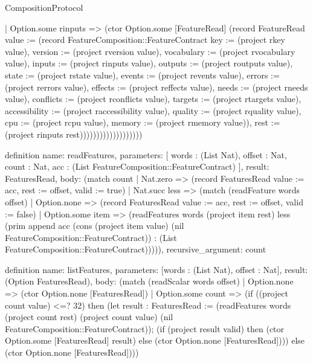 \begin{lexlean}{CompositionProtocol}
\begin{semanticmodule}
{                                  | Option.some rinputs => (ctor Option.some [FeatureRead] (record FeatureRead {value := (record FeatureComposition::FeatureContract {key := (project rkey value), version := (project rversion value), vocabulary := (project rvocabulary value), inputs := (project rinputs value), outputs := (project routputs value), state := (project rstate value), events := (project revents value), errors := (project rerrors value), effects := (project reffects value), needs := (project rneeds value), conflicts := (project rconflicts value), targets := (project rtargets value), accessibility := (project raccessibility value), quality := (project rquality value), cpu := (project rcpu value), memory := (project rmemory value)}), rest := (project rinputs rest)}))))))))))))))))))
}

definition{
  name: readFeatures,
  parameters: [
    words : (List Nat),
    offset : Nat,
    count : Nat,
    acc : (List FeatureComposition::FeatureContract)
  ],
  result: FeaturesRead,
  body: (match count
    | Nat.zero => (record FeaturesRead {value := acc, rest := offset, valid := true})
    | Nat.succ less => (match (readFeature words offset)
      | Option.none => (record FeaturesRead {value := acc, rest := offset, valid := false})
      | Option.some item => (readFeatures words (project item rest) less (prim append acc (cons (project item value) (nil FeatureComposition::FeatureContract)) : (List FeatureComposition::FeatureContract))))),
  recursive_argument: count
}

definition{
  name: listFeatures,
  parameters: [words : (List Nat), offset : Nat],
  result: (Option FeaturesRead),
  body: (match (readScalar words offset)
    | Option.none => (ctor Option.none [FeaturesRead])
    | Option.some count => (if ((project count value) <=? 32) then (let result : FeaturesRead := (readFeatures words (project count rest) (project count value) (nil FeatureComposition::FeatureContract)); (if (project result valid) then (ctor Option.some [FeaturesRead] result) else (ctor Option.none [FeaturesRead]))) else (ctor Option.none [FeaturesRead])))
}


\end{semanticmodule}
\end{lexlean}
